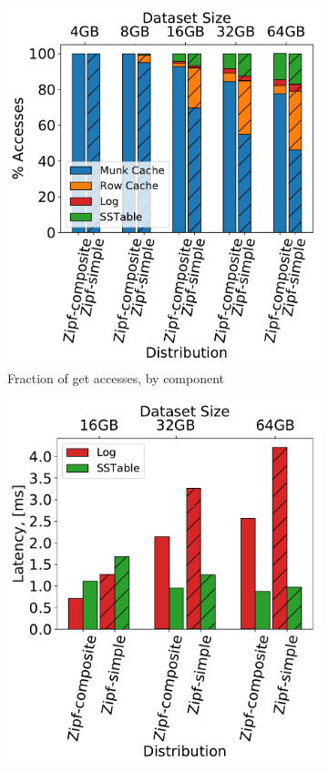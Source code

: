 {\begin{figure}[tb]
\begin{subfigure}{0.32\linewidth}
\includegraphics[width=\textwidth]{figs/Time_percentage_A.pdf}
\caption{Fraction of get accesses, by component}
\label{fig:tail_latency:dist}
\end{subfigure}
\begin{subfigure}{0.31\linewidth}
\includegraphics[width=\textwidth]{figs/Latency_A.pdf}

\end{subfigure}
\end{figure}}
